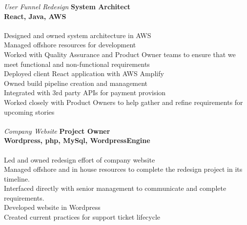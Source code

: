 \documentclass[margin,line]{resume}
\begin{document}
\begin{resume}
    \textsl{User Funnel Redesign}  \hfill \textbf{System Architect}\\
    \mbox{} \hfill \textbf{React, Java, AWS}\\\\
    Designed and owned system architecture in AWS\\
    Managed offshore resources for development\\
    Worked with Quality Assurance and Product Owner teams to ensure that we meet functional and non-functional requirements\\
    Deployed client React application with AWS Amplify\\
    Owned build pipeline creation and management\\
    Integrated with 3rd party APIs for payment provision\\ 
    Worked closely with Product Owners to help gather and refine requirements for upcoming stories\\
    \textbf{\listing} \vspace{0mm}\\\vspace{1mm}%
    \textsl{Company Website} \hfill \textbf{Project Owner}\\
    \mbox{} \hfill \textbf{Wordpress, php, MySql, WordpressEngine}\\\\
    Led and owned redesign effort of company website\\
    Managed offshore and in house resources to complete the redesign project in its timeline.\\
    Interfaced directly with senior management to communicate and complete requirements.\\
    Developed website in Wordpress\\
    Created current practices for support ticket lifecycle\\

\sectionline



\end{resume}
\end{document}
